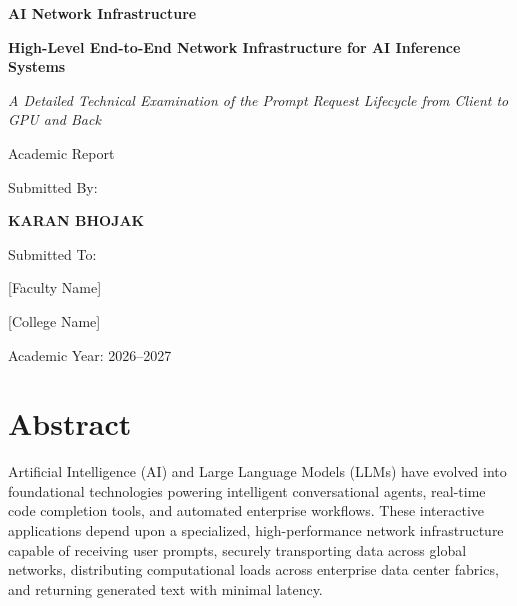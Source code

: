 \documentclass[12pt,a4paper]{report}
\begin{document}
\begin{titlepage}
    \centering

    \vspace*{1.5cm}

    {\Huge\bfseries AI Network Infrastructure\par}
    \vspace{0.4cm}
    {\LARGE\bfseries High-Level End-to-End Network Infrastructure for AI Inference Systems\par}
    \vspace{0.3cm}
    {\large\textit{A Detailed Technical Examination of the Prompt Request Lifecycle from Client to GPU and Back}\par}

    \vspace{1.5cm}

    {\Large Academic Report\par}

    \vspace{2cm}

    {\large Submitted By:\par}
    \vspace{0.3cm}
    {\Large\bfseries KARAN BHOJAK\par}

    \vspace{1.5cm}

    {\large Submitted To:\par}
    {\large [Faculty Name]\par}

    \vspace{1cm}

    {\large [College Name]\par}

    \vfill

    {\large Academic Year: 2026--2027\par}

    \vspace{1cm}
\end{titlepage}


\chapter*{Abstract}

Artificial Intelligence (AI) and Large Language Models (LLMs) have evolved into foundational technologies powering intelligent conversational agents, real-time code completion tools, and automated enterprise workflows. These interactive applications depend upon a specialized, high-performance network infrastructure capable of receiving user prompts, securely transporting data across global networks, distributing computational loads across enterprise data center fabrics, and returning generated text with minimal latency.
\end{document}
